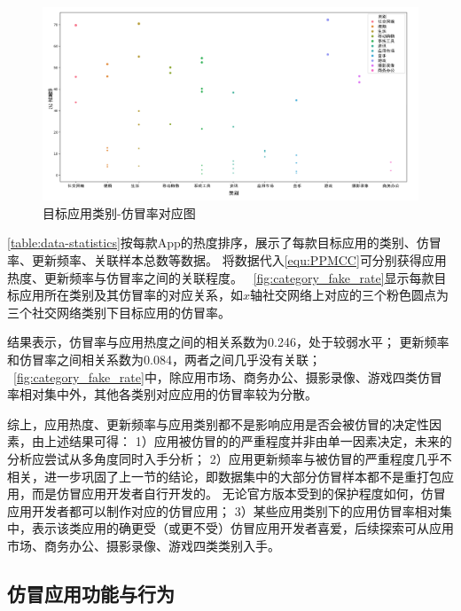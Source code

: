 \begin{figure}[htbp]
    \centering
    \setlength{\belowcaptionskip}{-10pt}
    \includegraphics[width=\textwidth]{./Figures/edwin-category-fake-rate.png}
    \caption{目标应用类别-仿冒率对应图}
    \label{fig:category_fake_rate}
\end{figure}

\autoref{table:data-statistics}按每款App的热度排序，展示了每款目标应用的类别、仿冒率、更新频率、关联样本总数等数据。
将数据代入\autoref{equ:PPMCC}可分别获得应用热度、更新频率与仿冒率之间的关联程度。
~\autoref{fig:category_fake_rate}显示每款目标应用所在类别及其仿冒率的对应关系，如$x$轴社交网络上对应的三个粉色圆点为三个社交网络类别下目标应用的仿冒率。

结果表示，仿冒率与应用热度之间的相关系数为0.246，处于较弱水平；
更新频率和仿冒率之间相关系数为0.084，两者之间几乎没有关联；
~\autoref{fig:category_fake_rate}中，除应用市场、商务办公、摄影录像、游戏四类仿冒率相对集中外，其他各类别对应应用的仿冒率较为分散。

综上，应用热度、更新频率与应用类别都不是影响应用是否会被仿冒的决定性因素，由上述结果可得：
1）应用被仿冒的的严重程度并非由单一因素决定，未来的分析应尝试从多角度同时入手分析；
2）应用更新频率与被仿冒的严重程度几乎不相关，进一步巩固了上一节的结论，即数据集中的大部分仿冒样本都不是重打包应用，而是仿冒应用开发者自行开发的。
无论官方版本受到的保护程度如何，仿冒应用开发者都可以制作对应的仿冒应用；
3）某些应用类别下的应用仿冒率相对集中，表示该类应用的确更受（或更不受）仿冒应用开发者喜爱，后续探索可从应用市场、商务办公、摄影录像、游戏四类类别入手。


\subsection{仿冒应用功能与行为}
\label{sec:func_and_behavior}



